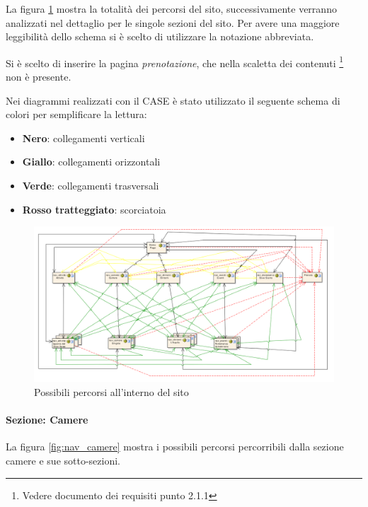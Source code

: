 \documentclass[a4paper,12pt,hidelinks]{report}
\begin{document}
La figura \ref{fig:navigazione} mostra la totalità dei percorsi del sito, successivamente verranno analizzati nel dettaglio per le singole sezioni del sito.
Per avere una maggiore leggibilità dello schema si è scelto di utilizzare la notazione abbreviata.
\par Si è scelto di inserire la pagina \textit{prenotazione}, che nella scaletta dei contenuti \footnote{Vedere documento dei requisiti punto 2.1.1} non è presente.
\par Nei diagrammi realizzati con il CASE è stato utilizzato il seguente schema di colori per semplificare la lettura:
\begin{itemize}
 \item \textbf{Nero}: collegamenti verticali
 \item \textbf{Giallo}: collegamenti orizzontali
 \item \textbf{Verde}: collegamenti trasversali
 \item \textbf{Rosso tratteggiato}: scorciatoia
\end{itemize}

\begin{figure}[h!]%
    \includegraphics[width=1.2\textwidth,keepaspectratio=true]{../../img/navigazione}
    \centering
    \caption{Possibili percorsi all'interno del sito}%
    \label{fig:navigazione}%
\end{figure}

\newpage
\paragraph{Sezione: Camere}

La figura \ref{fig:nav_camere} mostra i possibili percorsi percorribili dalla sezione camere e sue sotto-sezioni.
\end{document}
